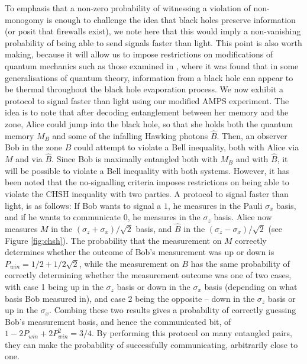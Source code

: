 \documentclass[12pt,a4paper]{article}
\begin{document}
To emphasis that a non-zero probability of witnessing a violation of non-monogomy is enough to challenge the idea that black holes preserve information (or posit that firewalls exist), we note here that this would imply a non-vanishing probability of being able to send signals faster than light. This point is also worth making, because it will allow us to impose restrictions on modifications of quantum mechanics such as those examined in \cite{muller2012black}, where it was found that in some generalisations of quantum theory, information from a black hole can appear to be thermal throughout the black hole evaporation process.
We now exhibit a protocol to signal faster than light using our modified AMPS experiment. The idea is to note that after decoding entanglement between her memory and the zone, Alice could jump into the black hole, so that she holds both  the quantum memory $M_B$ and some of the infalling Hawking photons ${\hat B}$. Then, an observer Bob in the zone $B$ could attempt to violate a Bell inequality, both with Alice via $M$ and via ${\hat B}$. Since Bob is maximally entangled both with $M_B$ and with  ${\hat B}$, it will be possible to violate a Bell inequality with both systems.  However, it has been noted that the no-signalling criteria imposes restrictions on being able to violate the CHSH inequality\cite{clauser1969proposed}  with two parties\cite{toner2006monogamy}. A protocol to signal faster than light, is as follows: If Bob wants to signal a $1$, he measures in the Pauli $\sigma_x$ basis, and if he wants to communicate $0$, he measures in the $\sigma_z$ basis. Alice now measures $M$ in the $(\sigma_z+\sigma_x)/\sqrt{2}$ basis, and ${\hat B}$ in the $(\sigma_z-\sigma_x)/\sqrt{2}$ (see Figure \ref{fig:chsh}). The probability that the measurement on $M$ correctly determines whether the outcome of Bob's measurement was up or down is $P_{win}=1/2+1/2\sqrt{2}$, while the measurement on $B$ has the same probability of correctly determining whether the measurement outcome was one of two cases, with case 1 being up in the $\sigma_z$ basis or down in the $\sigma_x$ basis (depending on what basis Bob measured in), and case 2 being the opposite -- down in the $\sigma_z$ basis or up in the $\sigma_x$. Combing these two results gives a probability of correctly guessing Bob's measurement basis, and hence the communicated bit, of $1-2P_{win}+2P^2_{win}=3/4$. By performing this protocol on many entangled pairs, they can make the probability of successfully communicating, arbitrarily close to one.
\end{document}
